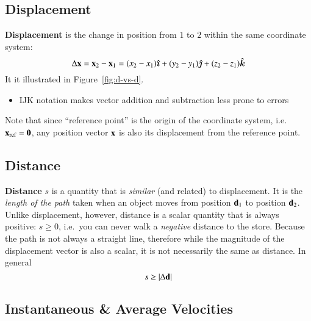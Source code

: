 \documentclass[11pt]{article}
\newcommand{\mb}[1]{\ensuremath\mathbf{#1}}
\begin{document}
\subsection{Displacement}

\textbf{Displacement} is the change in position from $1$ to $2$ within the
same coordinate system:
\begin{equation*}
  \Delta\mb{x}=\mb{x}_2-\mb{x}_1
  =(x_2-x_1)\bm{\hat{\imath}}+
  (y_2-y_1)\bm{\hat{\jmath}}+
  (z_2-z_1)\bm{\hat{k}}
\end{equation*}
It it illustrated in Figure~\ref{fig:d-vs-d}.
\begin{itemize}
\item IJK notation makes vector addition and subtraction less prone to errors
\end{itemize}
Note that since ``reference point'' is the origin of the coordinate system,
i.e.\ $\mb{x}_{\textrm{ref}}=\mb{0}$, any position vector $\mb{x}$ is also its
displacement from the reference point.



\subsection{Distance}%

\textbf{Distance} $s$ is a quantity that is \emph{similar} (and related) to
displacement. It is the \emph{length of the path} taken when an object moves
from position $\mb{d}_1$ to position $\mb{d}_2$. Unlike displacement, however,
distance is a scalar quantity that is always positive: $s\geq 0$, i.e.\ you can
never walk a \emph{negative} distance to the store.
Because the path is not always a straight line,
therefore while the magnitude of the displacement vector is also a scalar,
it is not necessarily the same as distance. In general
\begin{equation*}
  s\geq |\Delta\mb{d}|
\end{equation*}


\subsection{Instantaneous \& Average Velocities}
\end{document}
